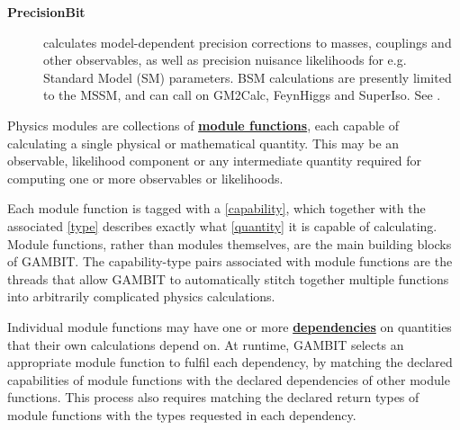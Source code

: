 \documentclass[pdftex,twocolumn,epjc3_preprint,runningheads]{svjour3}
\renewcommand{\_}{\discretionary{\underscore}{}{\underscore}}
\newcommand{\cross}[1]{\ref{#1}}
\newcommand{\doublecross}[2]{\hyperref[#2]{\textbf{#1}}}
\newcommand{\gambit}{\textsf{GAMBIT}\xspace}
\newcommand{\precisionbit}{\textsf{PrecisionBit}\xspace}
\newcommand{\GB}{\gambit}
\newcommand{\feynhiggs}{\textsf{FeynHiggs}\xspace}
\newcommand{\FH}{\feynhiggs}
\newcommand\gmtwocalc{\textsf{GM2Calc}\xspace}
\newcommand\superiso{\textsf{SuperIso}\xspace}
\begin{document}
\begin{description}
\item[\textbf{\precisionbit}\!]calculates model-dependent precision corrections to masses, couplings and other observables, as well as precision nuisance likelihoods for e.g. Standard Model (SM) parameters.  BSM calculations are presently limited to the MSSM, and can call on \gmtwocalc \cite{gm2calc}, \FH \cite{Bahl:2017aev,Bahl:2016brp,Hahn:2013ria,Frank:2006yh,Degrassi:2002fi,Heinemeyer:1998np,Heinemeyer:1998yj} and \superiso \cite{Mahmoudi:2007vz,Mahmoudi:2008tp,Mahmoudi:2009zz}.  See \cite{SDPBit}.
\end{description}

Physics modules are collections of \doublecross{module functions}{module function}, each capable of calculating a single physical or mathematical quantity. This may be an observable, likelihood component or any intermediate quantity required for computing one or more observables or likelihoods.

Each module function is tagged with a \cross{capability}, which together with the associated \cross{type} describes exactly what \cross{quantity} it is capable of calculating.  Module functions, rather than modules themselves, are the main building blocks of \GB.  The capability-type pairs associated with module functions are the threads that allow \GB to automatically stitch together multiple functions into arbitrarily complicated physics calculations.

Individual module functions may have one or more \doublecross{dependencies}{dependency} on quantities that their own calculations depend on.  At runtime, \GB selects an appropriate module function to fulfil each dependency, by matching the declared capabilities of module functions with the declared dependencies of other module functions.  This process also requires matching the declared return types of module functions with the types requested in each dependency.
\end{document}
